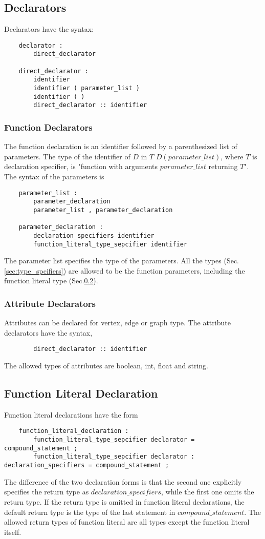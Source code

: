 \documentclass[letterpaper,12pt]{article}
\begin{document}
\subsection{Declarators}
Declarators have the syntax:
\begin{lstlisting}
	declarator :
		direct_declarator

	direct_declarator :
		identifier
		identifier ( parameter_list )
		identifier ( )	
		direct_declarator :: identifier
\end{lstlisting}

\subsubsection{Function Declarators}
The function declaration is an identifier followed by a parenthesized list of parameters. The type of the identifier of $D$ in $T$ $D(parameter\_list)$, where $T$ is declaration specifier, is "function with arguments $parameter\_list$ returning $T$". The syntax of the parameters is
\begin{lstlisting}
	parameter_list :
		parameter_declaration
		parameter_list , parameter_declaration

	parameter_declaration :
		declaration_specifiers identifier
		function_literal_type_sepcifier identifier
\end{lstlisting}
The parameter list specifies the type of the parameters. All the types (Sec.\ref{sec:type_spcifiers}) are allowed to be the function parameters, including the function literal type (Sec.\ref{sec:func_literal}).

\subsubsection{Attribute Declarators}
Attributes can be declared for vertex, edge or graph type. The attribute declarators have the syntax,
\begin{lstlisting}
		direct_declarator :: identifier
\end{lstlisting}
The allowed types of attributes are boolean, int, float and string. 

\subsection{Function Literal Declaration}\label{sec:func_literal}
Function literal declarations have the form
\begin{lstlisting}
	function_literal_declaration :
		function_literal_type_sepcifier declarator = compound_statement ;
		function_literal_type_sepcifier declarator : declaration_specifiers = compound_statement ;
\end{lstlisting}
The difference of the two declaration forms is that the second one explicitly specifies the return type as $declaration\_specifiers$, while the first one omits the return type.
If the return type is omitted in function literal declarations, the default return type is the type of the last statement in $compound\_statement$. The allowed return types of function literal are all types except the function literal itself. \newline
\end{document}
